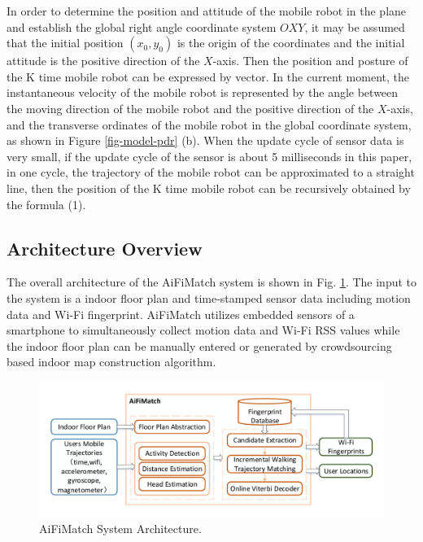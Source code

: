 \documentclass{llncs}
\begin{document}
In order to determine the position and attitude of the mobile robot in the plane and establish the global right angle coordinate system $OXY$, it may be assumed that the initial position $(x_0, y_0)$ is the origin of the coordinates and the initial attitude is the positive direction of the $X$-axis. Then the position and posture of the K time mobile robot can be expressed by vector. In the current moment, the instantaneous velocity of the mobile robot is represented by the angle between the moving direction of the mobile robot and the positive direction of the $X$-axis, and the transverse ordinates of the mobile robot in the global coordinate system, as shown in Figure \ref{fig-model-pdr} (b). When the update cycle of sensor data is very small, if the update cycle of the sensor is about 5 milliseconds in this paper, in one cycle, the trajectory of the mobile robot can be approximated to a straight line, then the position of the K time mobile robot can be recursively obtained by the formula (1).

\subsection{Architecture Overview}

The overall architecture of the AiFiMatch system is shown in Fig. \ref{fig-architecture}. The input to the system is a indoor floor plan and time-stamped sensor data including motion data and Wi-Fi fingerprint. AiFiMatch utilizes embedded sensors of a smartphone to simultaneously collect motion data and Wi-Fi RSS values while the indoor floor plan can be manually entered or generated by crowdsourcing based indoor map construction algorithm.

\vspace{-10pt}
\begin{figure}[!htbp]
	\centering
	\includegraphics[width=4.7in]{AiFiMatch-Architecture}
	\caption{AiFiMatch System Architecture.}
	\label{fig-architecture}
\end{figure}
\vspace{-10pt}
\end{document}
